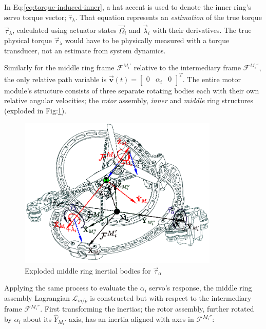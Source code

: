 \par
In Eq:\ref{eq:torque-induced-inner}, a hat accent is used to denote the inner ring's servo torque vector; $\hat{\tau}_\lambda$. That equation represents an \emph{estimation} of the true torque $\vec{\tau}_\lambda$, calculated using actuator states $\vec{\Omega}_i$ and $\dot{\vec{\lambda}}_i$ with their derivatives. The true physical torque $\vec{\tau}_\lambda$ would have to be physically measured with a torque transducer, not an estimate from system dynamics.
\par
Similarly for the middle ring frame $\mathcal{F}^{M_i'}$ relative to the intermediary frame $\mathcal{F}^{M_i''}$, the only relative path variable is $\vec{\mathbf{v}}(t)=\begin{bmatrix}0 & \alpha_i & 0\end{bmatrix}^T$. The entire motor module's structure consists of three separate rotating bodies each with their own relative angular velocities; the \emph{rotor} assembly, \emph{inner} and \emph{middle} ring structures (exploded in Fig:\ref{fig:response-middle}).
\begin{figure}[htbp]
\centering
\includegraphics[width=0.85\textwidth]{figs/response-middle}
\caption{Exploded middle ring inertial bodies for $\vec{\tau}_{\alpha}$}
\label{fig:response-middle}
\vspace{-16pt}
\end{figure}
\par
Applying the same process to evaluate the $ \alpha_i$ servo's response, the middle ring assembly Lagrangian $\mathcal{L}_{m/p}$ is constructed but with respect to the intermediary frame $\mathcal{F}^{M_i''}$. First transforming the inertias; the rotor assembly, further rotated by $\alpha_i$ about its $\hat{Y}_{M_i'}$ axis, has an inertia aligned with axes in $\mathcal{F}^{M_i''}$:
